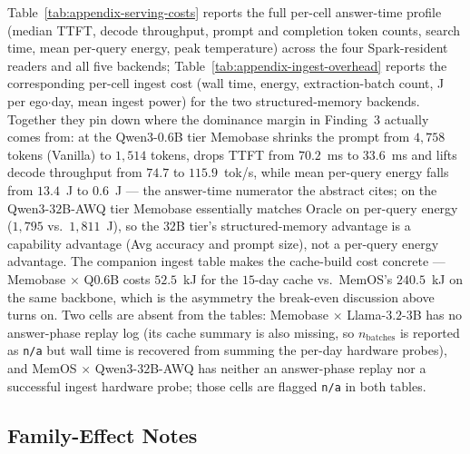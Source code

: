 Table~\ref{tab:appendix-serving-costs} reports the full per-cell answer-time profile (median TTFT, decode throughput, prompt and completion token counts, search time, mean per-query energy, peak temperature) across the four Spark-resident readers and all five backends; Table~\ref{tab:appendix-ingest-overhead} reports the corresponding per-cell ingest cost (wall time, energy, extraction-batch count, J per ego$\cdot$day, mean ingest power) for the two structured-memory backends.
Together they pin down where the dominance margin in Finding~3 actually comes from: at the Qwen3-$0.6$B tier Memobase shrinks the prompt from $4{,}758$ tokens (Vanilla) to $1{,}514$ tokens, drops TTFT from $70.2$~ms to $33.6$~ms and lifts decode throughput from $74.7$ to $115.9$~tok/s, while mean per-query energy falls from $13.4$~J to $0.6$~J --- the answer-time numerator the abstract cites; on the Qwen3-$32$B-AWQ tier Memobase essentially matches Oracle on per-query energy ($1{,}795$ vs.\ $1{,}811$~J), so the $32$B tier's structured-memory advantage is a capability advantage (Avg accuracy and prompt size), not a per-query energy advantage.
The companion ingest table makes the cache-build cost concrete --- Memobase $\times$ Q$0.6$B costs $52.5$~kJ for the $15$-day cache vs.\ MemOS's $240.5$~kJ on the same backbone, which is the asymmetry the break-even discussion above turns on.
Two cells are absent from the tables: Memobase $\times$ Llama-$3.2$-$3$B has no answer-phase replay log (its cache summary is also missing, so $n_\text{batches}$ is reported as \texttt{n/a} but wall time is recovered from summing the per-day hardware probes), and MemOS $\times$ Qwen3-$32$B-AWQ has neither an answer-phase replay nor a successful ingest hardware probe; those cells are flagged \texttt{n/a} in both tables.




\subsection{Family-Effect Notes}
\label{app:family-effects}

